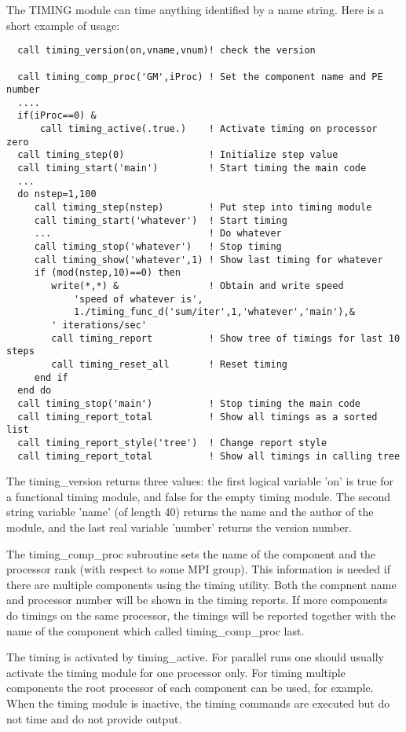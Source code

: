The TIMING module can time anything identified by a name string.
Here is a short example of usage:
{\footnotesize
\begin{verbatim}
  call timing_version(on,vname,vnum)! check the version

  call timing_comp_proc('GM',iProc) ! Set the component name and PE number
  ....
  if(iProc==0) &
      call timing_active(.true.)    ! Activate timing on processor zero
  call timing_step(0)               ! Initialize step value
  call timing_start('main')         ! Start timing the main code
  ...
  do nstep=1,100
     call timing_step(nstep)        ! Put step into timing module
     call timing_start('whatever')  ! Start timing
     ...                            ! Do whatever
     call timing_stop('whatever')   ! Stop timing
     call timing_show('whatever',1) ! Show last timing for whatever 
     if (mod(nstep,10)==0) then
        write(*,*) &                ! Obtain and write speed
            'speed of whatever is',
            1./timing_func_d('sum/iter',1,'whatever','main'),&
	    ' iterations/sec'
        call timing_report          ! Show tree of timings for last 10 steps
        call timing_reset_all       ! Reset timing
     end if
  end do
  call timing_stop('main')          ! Stop timing the main code
  call timing_report_total          ! Show all timings as a sorted list
  call timing_report_style('tree')  ! Change report style
  call timing_report_total          ! Show all timings in calling tree
\end{verbatim}
}
The timing\_version returns three values: the first logical variable
'on' is true for a functional timing module, and false for
the empty timing module. The second string variable 'name' (of length 40)
returns the name and the author of the module, and the last real variable
'number' returns the version number. 

The timing\_comp\_proc subroutine sets the name of the component and
the processor rank (with respect to some MPI group). This
information is needed if there are multiple components using the
timing utility. Both the compnent name and processor number will be
shown in the timing reports. If more components do timings on the same 
processor, the timings will be reported together with the name
of the component which called timing\_comp\_proc last.

The timing is activated by timing\_active. For parallel runs
one should usually activate the timing module for one processor only.
For timing multiple components the root processor of each component
can be used, for example.
When the timing module is inactive, the timing commands are executed 
but do not time and do not provide output.

